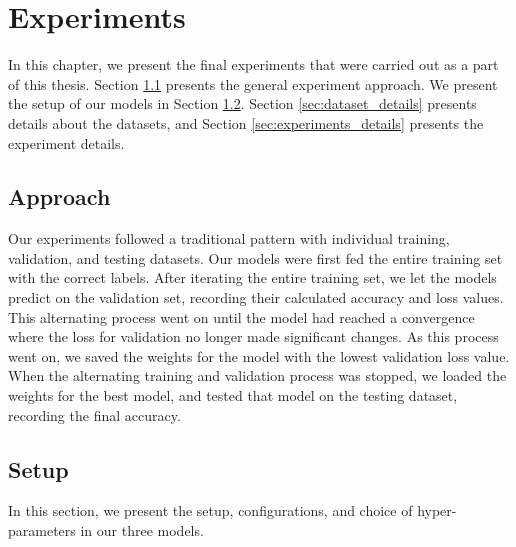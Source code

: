 
\chapter{Experiments}
\label{ch:experiments}
In this chapter, we present the final experiments that were carried out as a part of this thesis. Section \ref{sec:approach} presents the general experiment approach. We present the setup of our models in Section \ref{sec:setup}. Section \ref{sec:dataset_details} presents details about the datasets, and Section \ref{sec:experiments_details} presents the experiment details.


\section{Approach}
\label{sec:approach}
Our experiments followed a traditional pattern with individual training, validation, and testing datasets. Our models were first fed the entire training set with the correct labels. After iterating the entire training set, we let the models predict on the validation set, recording their calculated accuracy and loss values. This alternating process went on until the model had reached a convergence where the loss for validation no longer made significant changes. As this process went on, we saved the weights for the model with the lowest validation loss value. When the alternating training and validation process was stopped, we loaded the weights for the best model, and tested that model on the testing dataset, recording the final accuracy.


\section{Setup}
\label{sec:setup}
In this section, we present the setup, configurations, and choice of hyper-parameters in our three models. 

